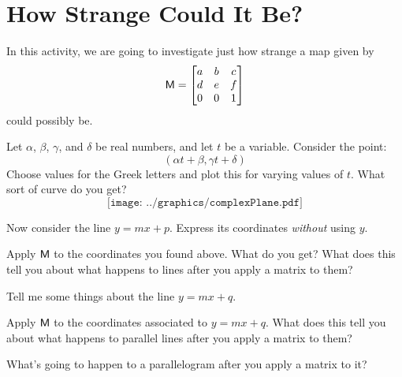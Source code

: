 \newpage
\section{How Strange Could It Be?} 
                                               
In this activity, we are going to investigate just how strange a map
given by
\[
\mathsf{M} = 
\begin{bmatrix}
a & b & c \\
d & e & f \\
0 & 0 & 1
\end{bmatrix}
\]
could possibly be.

\begin{prob}
Let $\alpha$, $\beta$, $\gamma$, and $\delta$ be real numbers, and let
$t$ be a variable. Consider the point:
\[
(\alpha t + \beta, \gamma t + \delta)
\]
Choose values for the Greek letters and plot this for varying values
of $t$. What sort of curve do you get?
\[
\texttt{[image: ../graphics/complexPlane.pdf]}
\]
\end{prob}

\begin{prob}
Now consider the line $y = mx + p$. Express its
coordinates \textit{without} using $y$.
\end{prob}

\begin{prob} 
Apply $\mathsf{M}$ to the coordinates you found above. What do you get? What
does this tell you about what happens to lines after you apply a
matrix to them?
\end{prob}

\begin{prob}
Tell me some things about the line $y = mx + q$. 
\end{prob}

\begin{prob}
Apply  $\mathsf{M}$ to the coordinates associated to $y = mx + q$. What does this tell you about what happens to parallel lines after you apply a matrix to them?
\end{prob}


\begin{prob}
What's going to happen to a parallelogram after you apply a matrix to
it?
\end{prob}
